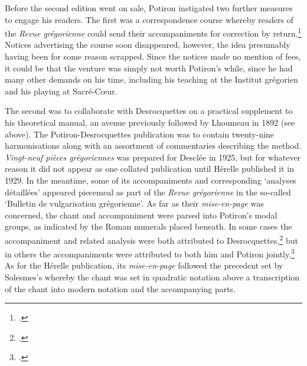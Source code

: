Before the second edition went on sale, Potiron instigated two further measures to engage his readers.
The first was a correspondence course whereby readers of the \emph{Revue grégorienne} could send their accompaniments for correction by return.\footcite[120]{DesrocquettesCoursaccompagnementpar1925}
Notices advertising the course soon disappeared, however, the idea presumably having been for some reason scrapped.
Since the notices made no mention of fees, it could be that the venture was simply not worth Potiron's while, since he had many other demands on his time, including his teaching at the Institut grégorien and his playing at Sacré-Cœur.

The second was to collaborate with Desrocquettes on a practical supplement to his theoretical manual, an avenue previously followed by Lhoumeau in 1892 (see  above).
The Potiron-Desrocquettes publication was to contain twenty-nine harmonisations along with an assortment of commentaries describing the method.
\emph{Vingt-neuf pièces grégoriennes} was prepared for Desclée in 1925, but for whatever reason it did not appear as one collated publication until Hérelle published it in 1929.
In the meantime, some of its accompaniments and corresponding `analyses détaillées' appeared piecemeal as part of the \emph{Revue grégorienne} in the so-called `Bulletin de vulgarisation grégorienne'.
As far as their \emph{mise-en-page} was concerned, the chant and accompaniment were parsed into Potiron's modal groups, as indicated by the Roman numerals placed beneath.
In some cases the accompaniment and related analysis were both attributed to Desrocquettes,\footcite[p.~224 n.~1, p.~227]{DesrocquettesAccompagnementAgnusMesse1925} but in others the accompaniments were attributed to both him and Potiron jointly.\footcite[182]{DesrocquettesHarmonisationIntroitGaudeamus1927}
As for the Hérelle publication, its \emph{mise-en-page} followed the precedent set by Solesmes's \ldo{} whereby the chant was set in quadratic notation above a transcription of the chant into modern notation and the accompanying parts.

